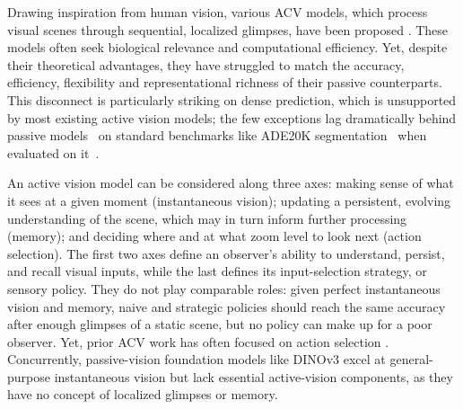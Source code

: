 \documentclass{article}
\begin{document}
Drawing inspiration from human vision,
various \ac{ACV} models, which process visual scenes through sequential, localized glimpses, have been proposed
\cite{mnihRecurrentModelsVisual2014,
DRAMBaMK14,
matheReinforcementLearningVisual2016,
ablavatski2017enriched,
elsayedSaccaderImprovingAccuracy2019,
wangGlanceFocusDynamic2020,
papadopoulosHardAttentionScalableImage2021,
seifiGlimpseAttendandExploreSelfAttentionActive2021,
liuImprovedEfficiencyBased2023,
AMEPardylRK0T23,
pardylAdaGlimpseActiveVisual2025,
wangEmulatingHumanlikeAdaptive2025,
pourrahimiNeuralSignaturesAssociational2025,
ibrayevExploringFoveationSaccade2024,
ibrayevTwoStreamFoveationBasedActive2024,
renEndToEndInstanceSegmentation2017,
liModelingHumanEye2023,
olszewskiTORETokenRecycling2025}.
These models often seek biological relevance and computational efficiency.
Yet, despite their theoretical advantages, they have struggled to match the accuracy, efficiency, flexibility and representational richness of their passive counterparts.
This disconnect is particularly striking on dense prediction,
which is unsupported by most existing active vision models;
the few exceptions lag dramatically behind passive models~\cite{yangFocalAttentionLongRange2021,yangFocalModulationNetworks2022}
on standard benchmarks like ADE20K segmentation~\cite{zhouSceneParsingADE20K2017} when evaluated on it~\cite{AMEPardylRK0T23,pardylAdaGlimpseActiveVisual2025}.

An active vision model can be considered along three axes:
making sense of what it sees at a given moment (instantaneous vision);
updating a persistent, evolving understanding of the scene,
which may in turn inform further processing (memory);
and deciding where and at what zoom level to look next (action selection).
The first two axes define an observer's ability to understand, persist, and recall visual inputs,
while the last defines its input-selection strategy, or sensory policy.
They do not play comparable roles:
given perfect instantaneous vision and memory,
naive and strategic policies should reach the same accuracy after enough glimpses of a static scene,
but no policy can make up for a poor observer.
Yet, prior \ac{ACV} work has often focused on action selection
\cite{mnihRecurrentModelsVisual2014,
DRAMBaMK14,
matheReinforcementLearningVisual2016,
ablavatski2017enriched,
elsayedSaccaderImprovingAccuracy2019,
wangGlanceFocusDynamic2020,
papadopoulosHardAttentionScalableImage2021,
seifiGlimpseAttendandExploreSelfAttentionActive2021,
liuImprovedEfficiencyBased2023,
AMEPardylRK0T23,
pardylAdaGlimpseActiveVisual2025,
wangEmulatingHumanlikeAdaptive2025,
pourrahimiNeuralSignaturesAssociational2025,
ibrayevTwoStreamFoveationBasedActive2024}.
Concurrently, passive-vision foundation models like DINOv3 \cite{simeoniDINOv32026}
excel at general-purpose instantaneous vision
but lack essential active-vision components,
as they have no concept of localized glimpses or memory.
\end{document}
